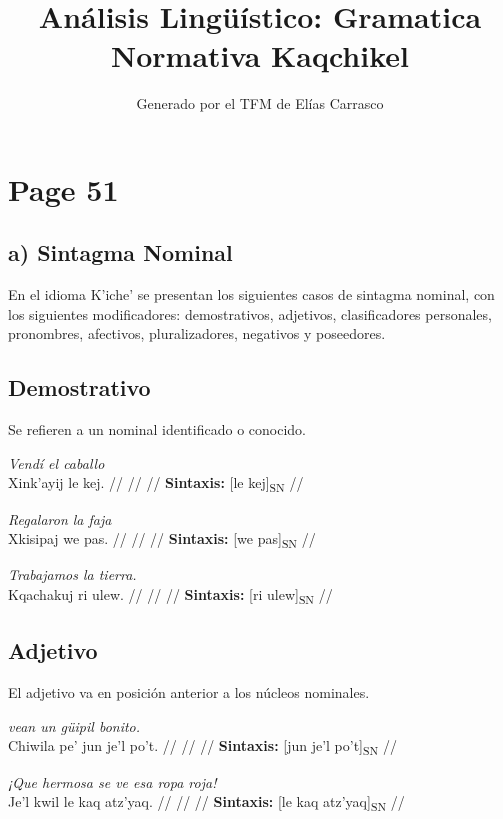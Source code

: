 \documentclass{article}%
\title{Análisis Lingüístico: Gramatica Normativa Kaqchikel}%
\author{Generado por el TFM de Elías Carrasco}%
\begin{document}
%
\normalsize%
\maketitle%
\section{Page 51}%
\label{sec:Page51}%
\subsection{a) Sintagma Nominal}%
\label{subsec:a)SintagmaNominal}%

%
En el idioma K’iche’ se presentan los siguientes casos de sintagma nominal, con los %
siguientes modificadores: demostrativos, adjetivos, clasificadores personales, pronombres, %
afectivos, pluralizadores, negativos y poseedores. %
\subsection{Demostrativo}%
\label{subsec:Demostrativo}%

%
Se refieren a un nominal identificado o conocido. %
\par\medskip%
\ex
\textit{Vendí el caballo} \\
\begingl
\gla Xink’ayij le kej. //
\glb  //
\glc  //
\glft \textbf{Sintaxis:} [le kej]\textsubscript{SN} //
\endgl
\xe
%
\medskip%
\par\medskip%
\ex
\textit{Regalaron la faja} \\
\begingl
\gla Xkisipaj we pas. //
\glb  //
\glc  //
\glft \textbf{Sintaxis:} [we pas]\textsubscript{SN} //
\endgl
\xe
%
\medskip%
\par\medskip%
\ex
\textit{Trabajamos la tierra.} \\
\begingl
\gla Kqachakuj ri ulew. //
\glb  //
\glc  //
\glft \textbf{Sintaxis:} [ri ulew]\textsubscript{SN} //
\endgl
\xe
%
\medskip%
\subsection{Adjetivo}%
\label{subsec:Adjetivo}%

%
El adjetivo va en posición anterior a los núcleos nominales. %
\par\medskip%
\ex
\textit{vean un güipil bonito.} \\
\begingl
\gla Chiwila pe’ jun je’l po’t. //
\glb  //
\glc  //
\glft \textbf{Sintaxis:} [jun je'l po't]\textsubscript{SN} //
\endgl
\xe
%
\medskip%
\par\medskip%
\ex
\textit{¡Que hermosa se ve esa ropa roja!} \\
\begingl
\gla Je’l kwil le kaq atz’yaq. //
\glb  //
\glc  //
\glft \textbf{Sintaxis:} [le kaq atz'yaq]\textsubscript{SN} //
\endgl
\xe
%
\medskip%
\end{document}
